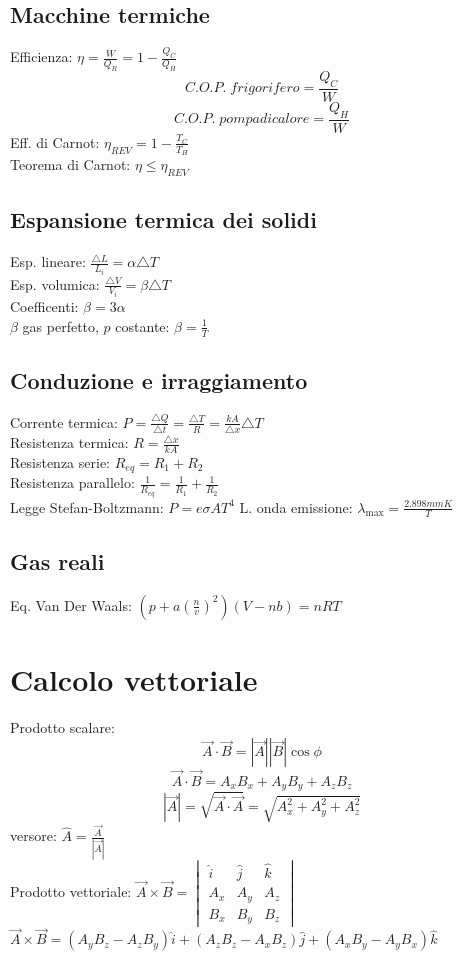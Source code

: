 \documentclass{article}
\begin{document}
\begin{small}
\begin{multicols}{3}
	\subsection{Macchine termiche}
		Efficienza: $ \eta = \frac{ W }{ Q_R } = 1 - \frac{ Q_C }{ Q_H } $
		\[ C.O.P. \; frigorifero = \frac{ Q_C }{ W } \]
		\[ C.O.P. \; pompa di calore = \frac{ Q_H }{ W } \]
		Eff. di Carnot: $ \eta_{REV} = 1 - \frac{ T_C }{ T_H } $ \\
		Teorema di Carnot: $ \eta \leq \eta_{REV} $
	\subsection{Espansione termica dei solidi}
		Esp. lineare: $ \frac{ \triangle L }{ L_i } = \alpha \triangle T $ \\
		Esp. volumica: $ \frac{ \triangle V }{ V_i } = \beta \triangle T $ \\
		Coefficenti: $ \beta = 3 \alpha $ \\
		$\beta$ gas perfetto, $p$ costante: $ \beta = \frac{1}{ T } $
	\subsection{Conduzione e irraggiamento}
		Corrente termica: $ P = \frac{ \triangle Q }{ \triangle t } = \frac{ \triangle T }{ R } = \frac{ k A }{ \triangle x } \triangle T $ \\
		Resistenza termica: $ R = \frac{ \triangle x }{ k A } $ \\
		Resistenza serie: $ R_{eq} = R_1 + R_2 $ \\
		Resistenza parallelo: $ \frac{1}{ R_{eq} } = \frac{1}{ R_1 } + \frac{1}{ R_2 } $ \\
		Legge Stefan-Boltzmann: $ P = e \sigma A T^4 $
		L. onda emissione: $ \lambda_{\max} = \frac{ 2.898 mmK }{ T } $
	\subsection{Gas reali}
		Eq. Van Der Waals: $ ( p + a ( \frac{ n }{ v } )^2 ) ( V - n b ) = n R T $
\section{Calcolo vettoriale}
		Prodotto scalare:
		\[ \vec A \cdot \vec B = | \vec A | | \vec B | \cos \phi \]
		\[ \vec A \cdot \vec B = A_x B_x + A_y B_y + A_z B_z \]
		\[ | \vec A | = \sqrt{ \vec A \cdot \vec A } = \sqrt{ A_x^2 + A_y^2 + A_z^2 } \]
		versore: $ \hat A = \frac{ \vec A }{ | \vec A | } $ \\
		Prodotto vettoriale:
		$ \vec A \times \vec B = \begin{vmatrix} \hat i & \hat j & \hat k \\ A_x & A_y & A_z \\ B_x & B_y & B_z \end{vmatrix} $ \\
		$ \vec A \times \vec B = ( A_y B_z - A_z B_y ) \hat i + ( A_z B_z - A_x B_z ) \hat j + ( A_x B_y - A_y B_x ) \hat k $

\end{multicols}
\end{small}
\end{document}
